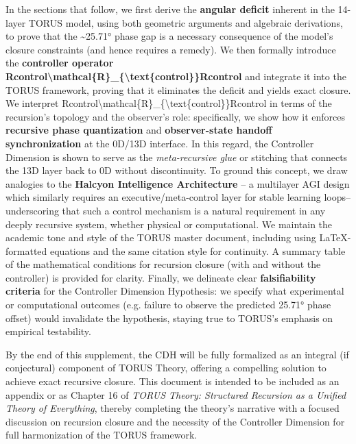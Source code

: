 \documentclass[
]{article}
\begin{document}
In the sections that follow, we first derive the \textbf{angular
deficit} inherent in the 14-layer TORUS model, using both geometric
arguments and algebraic derivations, to prove that the
\textasciitilde25.71° phase gap is a necessary consequence of the
model's closure constraints (and hence requires a remedy). We then
formally introduce the \textbf{controller operator
Rcontrol\textbackslash mathcal\{R\}\_\{\textbackslash text\{control\}\}Rcontrol\hspace{0pt}}
and integrate it into the TORUS framework, proving that it eliminates
the deficit and yields exact closure. We interpret
Rcontrol\textbackslash mathcal\{R\}\_\{\textbackslash text\{control\}\}Rcontrol\hspace{0pt}
in terms of the recursion's topology and the observer's role:
specifically, we show how it enforces \textbf{recursive phase
quantization} and \textbf{observer-state handoff synchronization} at the
0D/13D interface. In this regard, the Controller Dimension is shown to
serve as the \emph{meta-recursive glue} or stitching that connects the
13D layer back to 0D without discontinuity. To ground this concept, we
draw analogies to the \textbf{Halcyon Intelligence Architecture} -- a
multilayer AGI design which similarly requires an executive/meta-control
layer for stable learning loops\hspace{0pt}-- underscoring that such a
control mechanism is a natural requirement in any deeply recursive
system, whether physical or computational. We maintain the academic tone
and style of the TORUS master document, including using LaTeX-formatted
equations and the same citation style for continuity. A summary table of
the mathematical conditions for recursion closure (with and without the
controller) is provided for clarity. Finally, we delineate clear
\textbf{falsifiability criteria} for the Controller Dimension
Hypothesis: we specify what experimental or computational outcomes (e.g.
failure to observe the predicted 25.71° phase offset) would invalidate
the hypothesis, staying true to TORUS's emphasis on empirical
testability\hspace{0pt}.

By the end of this supplement, the CDH will be fully formalized as an
integral (if conjectural) component of TORUS Theory, offering a
compelling solution to achieve exact recursive closure. This document is
intended to be included as an appendix or as Chapter 16 of \emph{TORUS
Theory: Structured Recursion as a Unified Theory of Everything}, thereby
completing the theory's narrative with a focused discussion on recursion
closure and the necessity of the Controller Dimension for full
harmonization of the TORUS framework.
\end{document}
